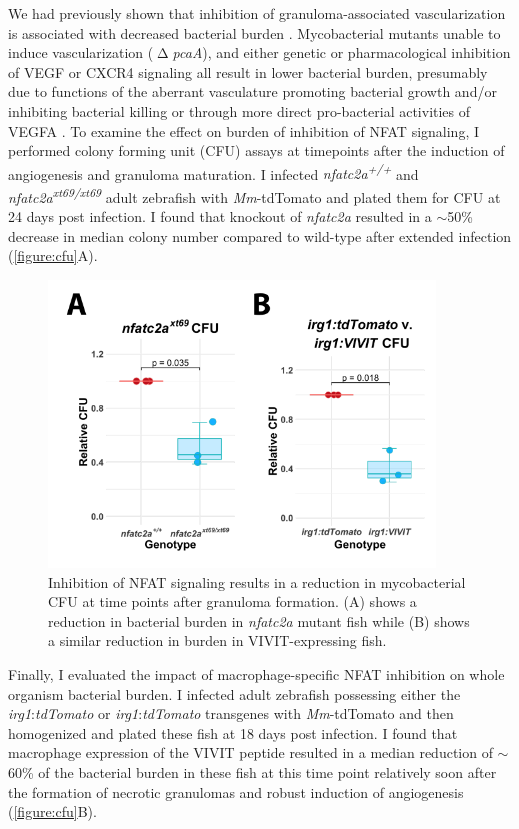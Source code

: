 We had previously shown that inhibition of granuloma\hyp{}associated vascularization is associated with decreased bacterial burden \citep{Oehlers2015}. Mycobacterial mutants unable to induce vascularization ($\upDelta$\textit{pcaA}), and either genetic or pharmacological inhibition of VEGF or CXCR4 signaling all result in lower bacterial burden, presumably due to functions of the aberrant vasculature promoting bacterial growth and/or inhibiting bacterial killing \citep{Rao2005, Glickman2000, Oehlers2015, Walton2018} or through more direct pro\hyp{}bacterial activities of VEGFA \citep{Harding2019}. To examine the effect on burden of inhibition of NFAT signaling, I performed colony forming unit (CFU) assays at timepoints after the induction of angiogenesis and granuloma maturation. I infected \textit{nfatc2a\textsuperscript{+/+}} and \textit{nfatc2a\textsuperscript{xt69/xt69}} adult zebrafish with \textit{Mm}\hyp{}tdTomato and plated them for CFU at 24 days post infection. I found that knockout of \textit{nfatc2a} resulted in a ${\sim}$50\% decrease in median colony number compared to wild\hyp{}type after extended infection (\autoref{figure:cfu}A). 

\begin{figure}
\centering
\includegraphics[height=3in]{images/cfu.pdf}
\caption[NFAT inhibition decreases bacterial burden]{Inhibition of NFAT signaling results in a reduction in mycobacterial CFU at time points after granuloma formation. (A) shows a reduction in bacterial burden in \textit{nfatc2a} mutant fish while (B) shows a similar reduction in burden in VIVIT\hyp{}expressing fish.}
\label{figure:cfu}

\end{figure}

Finally, I evaluated the impact of macrophage\hyp{}specific NFAT inhibition on whole organism bacterial burden. I infected adult zebrafish possessing either the \textit{irg1}:\textit{tdTomato} or \textit{irg1}:\textit{tdTomato} transgenes with \textit{Mm}\hyp{}tdTomato and then homogenized and plated these fish at 18 days post infection. I found that macrophage expression of the VIVIT peptide resulted in a median reduction of ${\sim}$60\% of the bacterial burden in these fish at this time point relatively soon after the formation of necrotic granulomas and robust induction of angiogenesis (\autoref{figure:cfu}B).
 
